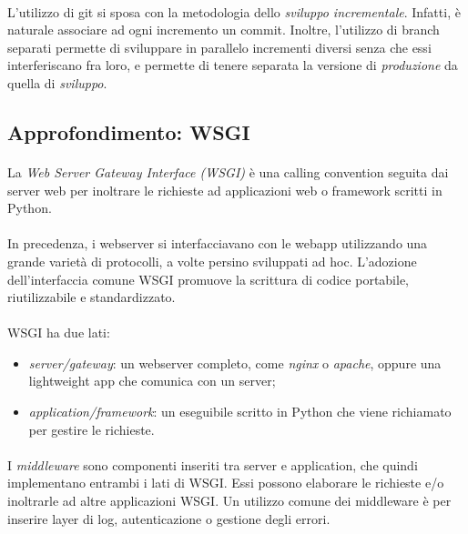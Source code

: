 \documentclass[12pt,a4paper,twoside,english,italian]{book}
\begin{document}
\paragraph{} L'utilizzo di git si sposa con la metodologia dello \emph{sviluppo incrementale}. Infatti, è naturale associare ad ogni incremento un commit. Inoltre, l'utilizzo di branch separati permette di sviluppare in parallelo incrementi diversi senza che essi interferiscano fra loro, e permette di tenere separata la versione di \emph{produzione} da quella di \emph{sviluppo}.

\subsection{Approfondimento: WSGI}

\paragraph{} La \emph{Web Server Gateway Interface (WSGI)} \cite{wsgi} è una calling convention seguita dai server web per inoltrare le richieste ad applicazioni web o framework scritti in Python. 

\paragraph{} In precedenza, i webserver si interfacciavano con le webapp utilizzando una grande varietà di protocolli, a volte persino sviluppati ad hoc. L'adozione dell'interfaccia comune WSGI promuove la scrittura di codice portabile, riutilizzabile e standardizzato.

\paragraph{} WSGI ha due lati:
\begin{itemize}
    \item \emph{server/gateway}: un webserver completo, come \emph{nginx} o \emph{apache}, oppure una lightweight app che comunica con un server;
    \item \emph{application/framework}: un eseguibile scritto in Python che viene richiamato per gestire le richieste.
\end{itemize}

\paragraph{} I \emph{middleware} sono componenti inseriti tra server e application, che quindi implementano entrambi i lati di WSGI. Essi possono elaborare le richieste e/o inoltrarle ad altre applicazioni WSGI. Un utilizzo comune dei middleware è per inserire layer di log, autenticazione o gestione degli errori. 
\end{document}
